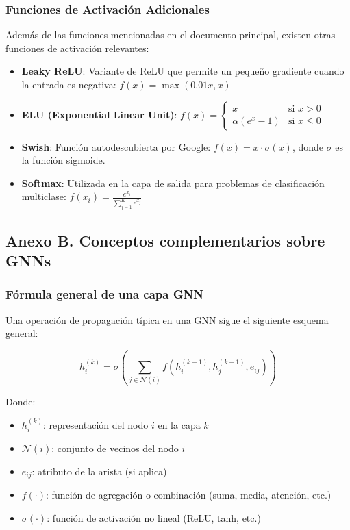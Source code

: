 \documentclass[11pt]{article} %
\begin{document}
\subsubsection{Funciones de Activación Adicionales}

Además de las funciones mencionadas en el documento principal, existen otras funciones de activación relevantes:

\begin{itemize}
    \item \textbf{Leaky ReLU}: Variante de ReLU que permite un pequeño gradiente cuando la entrada es negativa: $f(x) = \max(0.01x, x)$
    
    \item \textbf{ELU (Exponential Linear Unit)}: $f(x) = \begin{cases} x & \text{si } x > 0 \\ \alpha(e^x - 1) & \text{si } x \leq 0 \end{cases}$
    
    \item \textbf{Swish}: Función autodescubierta por Google: $f(x) = x \cdot \sigma(x)$, donde $\sigma$ es la función sigmoide.
    
    \item \textbf{Softmax}: Utilizada en la capa de salida para problemas de clasificación multiclase: $f(x_i) = \frac{e^{x_i}}{\sum_{j=1}^{K} e^{x_j}}$
\end{itemize}

\subsection{Anexo B. Conceptos complementarios sobre GNNs}

\subsubsection{Fórmula general de una capa GNN}
Una operación de propagación típica en una GNN sigue el siguiente esquema general:

\[
h_i^{(k)} = \sigma \left( \sum_{j \in \mathcal{N}(i)} f\left(h_i^{(k-1)}, h_j^{(k-1)}, e_{ij}\right) \right)
\]

Donde:
\begin{itemize}
    \item $h_i^{(k)}$: representación del nodo $i$ en la capa $k$
    \item $\mathcal{N}(i)$: conjunto de vecinos del nodo $i$
    \item $e_{ij}$: atributo de la arista (si aplica)
    \item $f(\cdot)$: función de agregación o combinación (suma, media, atención, etc.)
    \item $\sigma(\cdot)$: función de activación no lineal (ReLU, tanh, etc.)
\end{itemize}
\end{document}
